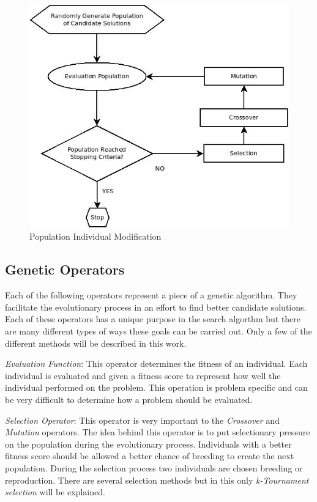 \begin{figure}[H]
	\centering
	\includegraphics[bb=0 0 559 481,scale=0.5]{figures/GA.jpeg}
	\caption{Population Individual Modification}
	\label{fig:gaFlowchart}
\end{figure}

\subsection{Genetic Operators}

Each of the following operators represent a piece of a genetic algorithm. They facilitate the evolutionary process in an effort to find better candidate solutions. Each of these operators has a unique purpose in the search algorthm but there are many different types of ways these goals can be carried out. Only a few of the different methods will be described in this work.

\textit{Evaluation Function}: This operator determines the fitness of an individual. Each individual is evaluated and given a fitness score to represent how well the individual performed on the problem. This operation is problem specific and can be very difficult to determine how a problem should be evaluated.

\textit{Selection Operator}: This operator is very important to the \textit{Crossover} and \textit{Mutation} operators. The idea behind this operator is to put selectionary pressure on the population during the evolutionary process. Individuals with a better fitness score should be allowed a better chance of breeding to create the next population. During the selection process two individuals are chosen breeding or reproduction. There are several selection methods but in this only \textit{k-Tournament selection} will be explained.

